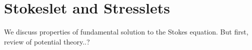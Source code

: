\section{Stokeslet and Stresslets}
We discuss properties of fundamental solution to the Stokes equation. But first, review of potential theory..?
